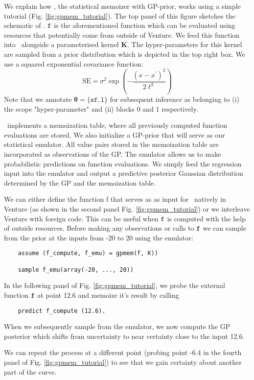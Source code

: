 We explain how \gpmem, the statistical memoizer with \ac{GP}-prior, works using a simple tutorial
(Fig. \ref{fig:gpmem_tutorial}). 
The top panel of this figure sketches the schematic of \gpmem.
$\texttt{f}$ is the aforementioned function which can be evaluated using resources that potentially come
from outside of Venture.  
We feed this function into \gpmem\ alongside
a parameterised kernel $\mathbf{K}$. The hyper-parameters for this kernel are sampled from a 
prior distribution which is depicted in the top right box. 
We use a squared exponential covariance function:
\[
\text{SE} = \sigma^2 \exp(-\frac{(x-x^\prime)^2}{2\ell^2})
\]
Note that we annotate $\bm{\theta}=\{\texttt{sf},\texttt{l}\}$ for subsequent
inference as belonging to (i) the scope "hyper-parameter" and (ii) blocks 0 and 1 respectively.

\gpmem\ implements a memoization table, where all previously
computed function evaluations are stored. We also initialize a \ac{GP}-prior that
will serve as our statistical emulator.
All value pairs stored in the memoization table are incorporated as observations of
the \ac{GP}.
The emulator allows us to make probabilistic predictions on function evaluations.
We simply feed the regression input
into the emulator and output a predictive posterior Gaussian distribution determined by the \ac{GP} and
the memoization table.

We can either define the function f that serves as as input for \gpmem\
 natively in Venture
(as shown in the second panel Fig. \ref{fig:gpmem_tutorial}) or we interleave Venture with foreign code. 
This can be useful when $\texttt{f}$ is computed with the help of outside resources.
Before making any observations or calls to $\texttt{f}$
we can sample from the prior at the inputs from -20 to 20 using the emulator:
    \begin{lstlisting}
    assume (f_compute, f_emu) = gpmem(f, K))

    sample f_emu(array(-20, ..., 20))
    \end{lstlisting}
In the following panel of Fig. \ref{fig:gpmem_tutorial}, we probe the external function $\texttt{f}$ at point 12.6 and memoize it's result by calling 
   \begin{lstlisting}
    predict f_compute (12.6).
    \end{lstlisting}
When we subsequently sample from the emulator, we now compute the \ac{GP} posterior which shifts from uncertainty to near certainty close to the input 12.6.

We can repeat the process at a different point (probing point -6.4 in the fourth panel of Fig. \ref{fig:gpmem_tutorial}) to see that we gain certainty about another part of the curve. 

